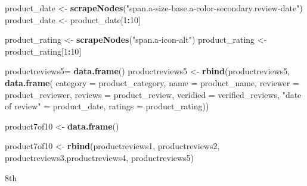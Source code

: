 \documentclass[
]{article}
\newenvironment{Shaded}{\begin{snugshade}}{\end{snugshade}}
\newcommand{\AttributeTok}[1]{\textcolor[rgb]{0.13,0.29,0.53}{#1}}
\newcommand{\DecValTok}[1]{\textcolor[rgb]{0.00,0.00,0.81}{#1}}
\newcommand{\FunctionTok}[1]{\textcolor[rgb]{0.13,0.29,0.53}{\textbf{#1}}}
\newcommand{\NormalTok}[1]{#1}
\newcommand{\OtherTok}[1]{\textcolor[rgb]{0.56,0.35,0.01}{#1}}
\newcommand{\SpecialCharTok}[1]{\textcolor[rgb]{0.81,0.36,0.00}{\textbf{#1}}}
\newcommand{\StringTok}[1]{\textcolor[rgb]{0.31,0.60,0.02}{#1}}
\begin{document}
\begin{Shaded}
\begin{Highlighting}[]
\NormalTok{  product\_date }\OtherTok{\textless{}{-}} \FunctionTok{scrapeNodes}\NormalTok{(}\StringTok{"span.a{-}size{-}base.a{-}color{-}secondary.review{-}date"}\NormalTok{)}
\NormalTok{  product\_date }\OtherTok{\textless{}{-}}\NormalTok{ product\_date[}\DecValTok{1}\SpecialCharTok{:}\DecValTok{10}\NormalTok{]}
  
\NormalTok{  product\_rating }\OtherTok{\textless{}{-}} \FunctionTok{scrapeNodes}\NormalTok{(}\StringTok{"span.a{-}icon{-}alt"}\NormalTok{)}
\NormalTok{  product\_rating }\OtherTok{\textless{}{-}}\NormalTok{ product\_rating[}\DecValTok{1}\SpecialCharTok{:}\DecValTok{10}\NormalTok{]}
  
\NormalTok{  productreviews5}\OtherTok{=} \FunctionTok{data.frame}\NormalTok{()}
\NormalTok{  productreviews5 }\OtherTok{\textless{}{-}} \FunctionTok{rbind}\NormalTok{(productreviews5, }\FunctionTok{data.frame}\NormalTok{(}
                      \AttributeTok{category =}\NormalTok{ product\_category,}
                      \AttributeTok{name =}\NormalTok{ product\_name,}
                      \AttributeTok{reviewer =}\NormalTok{ product\_reviewer,}
                      \AttributeTok{reviews =}\NormalTok{ product\_review,}
                      \AttributeTok{veridied =}\NormalTok{ verified\_reviews,}
                      \StringTok{"date of review"} \OtherTok{=}\NormalTok{ product\_date,}
                      \AttributeTok{ratings =}\NormalTok{ product\_rating))}

\NormalTok{  product7of10 }\OtherTok{\textless{}{-}} \FunctionTok{data.frame}\NormalTok{()}
  
\NormalTok{  product7of10 }\OtherTok{\textless{}{-}} \FunctionTok{rbind}\NormalTok{(productreviews1, productreviews2, productreviews3,productreviews4, productreviews5)}
\end{Highlighting}
\end{Shaded}

8th
\end{document}
